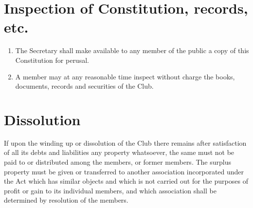 \documentclass[11pt]{article} %
\begin{document}
\section{Inspection of Constitution, records, etc.}
\begin{enumerate}
	\item The Secretary shall make available to any member of the public a copy of this Constitution for perusal.
	\item A member may at any reasonable time inspect without charge the books, documents, records and securities of the Club.
\end{enumerate}

\section{Dissolution}
If upon the winding up or dissolution of the Club there remains after satisfaction of all its debts and liabilities any property whatsoever, the same must not be paid to or distributed among the members, or former members. The surplus property must be given or transferred to another association incorporated under the Act which has similar objects and which is not carried out for the purposes of profit or gain to its individual members, and which association shall be determined by resolution of the members.
\end{document}
